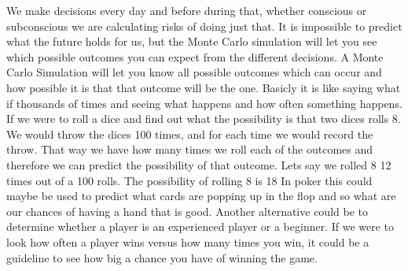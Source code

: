 We make decisions every day and before during that, whether conscious or subconscious we are calculating risks of doing just that. It is impossible to predict what the future holds for us, but the Monte Carlo simulation will let you see which possible outcomes you can expect from the different decisions.
A Monte Carlo Simulation will let you know all possible outcomes which can occur and how possible it is that that outcome will be the one.
Basicly it is like saying what if thousands of times and seeing what happens and how often something happens.
If we were to roll a dice and find out what the possibility is that two dices rolls 8. We would throw the dices 100 times, and for each time we would record the throw. That way we have how many times we roll each of the outcomes and therefore we can predict the possibility of that outcome.
Lets say we rolled 8 12 times out of a 100 rolls. The possibility of rolling 8 is 18%
In poker this could maybe be used to predict what cards are popping up in the flop and so what are our chances of having a hand that is good.
Another alternative could be to determine whether a player is an experienced player or a beginner. If we were to look how often a player wins versus how many times you win, it could be a guideline to see how big a chance you have of winning the game.
